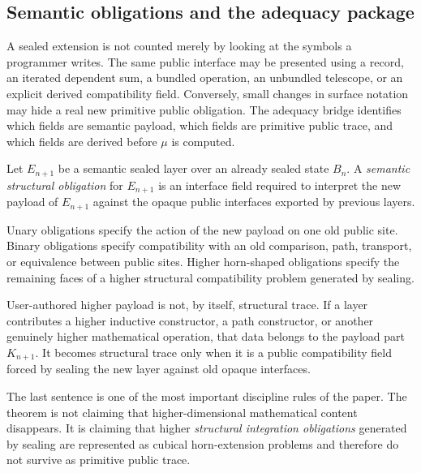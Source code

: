 \documentclass{lmcs}
\begin{document}
\subsection{Semantic obligations and the adequacy package}

A sealed extension is not counted merely by looking at the symbols a programmer writes.  The
same public interface may be presented using a record, an iterated dependent sum, a bundled
operation, an unbundled telescope, or an explicit derived compatibility field.  Conversely,
small changes in surface notation may hide a real new primitive public obligation.  The
adequacy bridge identifies which fields are semantic payload, which fields are primitive
public trace, and which fields are derived before \(\mu\) is computed.

\begin{defi}
Let \(E_{n+1}\) be a semantic sealed layer over an already sealed state \(B_n\).  A
\emph{semantic structural obligation} for \(E_{n+1}\) is an interface field required to
interpret the new payload of \(E_{n+1}\) against the opaque public interfaces exported by
previous layers.

Unary obligations specify the action of the new payload on one old public site.  Binary
obligations specify compatibility with an old comparison, path, transport, or equivalence
between public sites.  Higher horn-shaped obligations specify the remaining faces of a
higher structural compatibility problem generated by sealing.

User-authored higher payload is not, by itself, structural trace.  If a layer contributes a
higher inductive constructor, a path constructor, or another genuinely higher mathematical
operation, that data belongs to the payload part \(K_{n+1}\).  It becomes structural trace
only when it is a public compatibility field forced by sealing the new layer against old
opaque interfaces.
\end{defi}

The last sentence is one of the most important discipline rules of the paper.  The theorem
is not claiming that higher-dimensional mathematical content disappears.  It is claiming that
higher \emph{structural integration obligations} generated by sealing are represented as
cubical horn-extension problems and therefore do not survive as primitive public trace.
\end{document}
